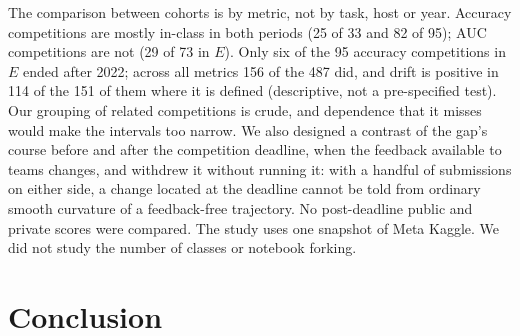 \documentclass[10pt]{article}
\begin{document}
The comparison between cohorts is by metric, not by task, host or year. Accuracy competitions are mostly in-class in both periods (25 of 33 and 82 of 95); AUC competitions are not (29 of 73 in $E$). Only six of the 95 accuracy competitions in $E$ ended after 2022; across all metrics 156 of the 487 did, and drift is positive in 114 of the 151 of them where it is defined (descriptive, not a pre-specified test). Our grouping of related competitions is crude, and dependence that it misses would make the intervals too narrow. We also designed a contrast of the gap's course before and after the competition deadline, when the feedback available to teams changes, and withdrew it without running it: with a handful of submissions on either side, a change located at the deadline cannot be told from ordinary smooth curvature of a feedback-free trajectory. No post-deadline public and private scores were compared. The study uses one snapshot of Meta Kaggle. We did not study the number of classes or notebook forking.

\section{Conclusion}
\end{document}
